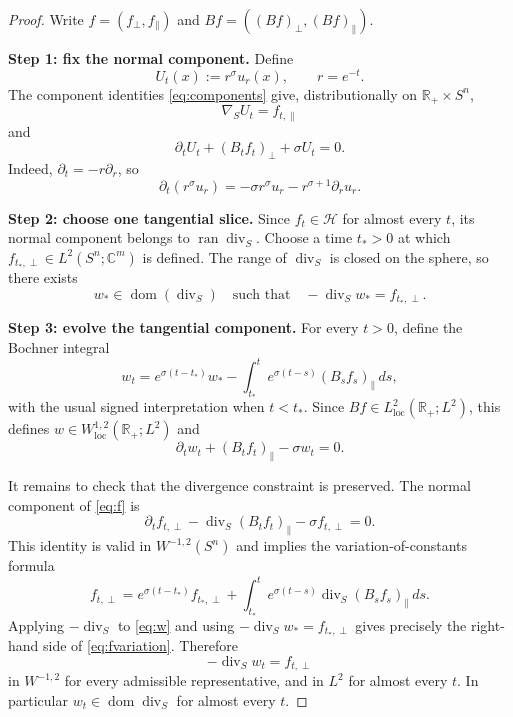 \documentclass[11pt]{article}
\newcommand{\Sphere}{S^n}
\newcommand{\cH}{\mathcal H}
\newcommand{\Div}{\operatorname{div}_{S}}
\newcommand{\grad}{\nabla_{S}}
\newcommand{\R}{\mathbb R}
\newcommand{\C}{\mathbb C}
\newcommand{\dom}{\operatorname{dom}}
\begin{document}
\begin{proof}
Write $f=(f_\perp,f_\parallel)$ and $Bf=((Bf)_\perp,(Bf)_\parallel)$.

\medskip
\noindent\textbf{Step 1: fix the normal component.}
Define
\[
 U_t(x):=r^\sigma u_r(x),\qquad r=e^{-t}.
\]
The component identities \eqref{eq:components} give, distributionally on $\R_+\times\Sphere$,
\begin{equation}\label{eq:Uspace}
 \grad U_t=f_{t,\parallel}
\end{equation}
and
\begin{equation}\label{eq:Utime}
 \partial_tU_t+(B_tf_t)_\perp+\sigma U_t=0.
\end{equation}
Indeed, $\partial_t=-r\partial_r$, so
\[
 \partial_t(r^\sigma u_r)
 =-\sigma r^\sigma u_r-r^{\sigma+1}\partial_r u_r.
\]

\medskip
\noindent\textbf{Step 2: choose one tangential slice.}
Since $f_t\in\cH$ for almost every $t$, its normal component belongs to $\operatorname{ran}\Div$. Choose a time $t_*>0$ at which $f_{t_*,\perp}\in L^2(\Sphere;\C^m)$ is defined. The range of $\Div$ is closed on the sphere, so there exists
\[
 w_*\in\dom(\Div)
 \quad\text{such that}\quad
 -\Div w_*=f_{t_*,\perp}.
\]

\medskip
\noindent\textbf{Step 3: evolve the tangential component.}
For every $t>0$, define the Bochner integral
\begin{equation}\label{eq:w}
 w_t=e^{\sigma(t-t_*)}w_*
 -\int_{t_*}^{t}e^{\sigma(t-s)}(B_sf_s)_\parallel\,ds,
\end{equation}
with the usual signed interpretation when $t<t_*$. Since $Bf\in L^2_{\mathrm{loc}}(\R_+;L^2)$, this defines
$w\in W^{1,2}_{\mathrm{loc}}(\R_+;L^2)$ and
\begin{equation}\label{eq:wt}
 \partial_tw_t+(B_tf_t)_\parallel-\sigma w_t=0.
\end{equation}

It remains to check that the divergence constraint is preserved. The normal component of \eqref{eq:f} is
\begin{equation}\label{eq:fnormal}
 \partial_tf_{t,\perp}-\Div(B_tf_t)_\parallel-\sigma f_{t,\perp}=0.
\end{equation}
This identity is valid in $W^{-1,2}(\Sphere)$ and implies the variation-of-constants formula
\begin{equation}\label{eq:fvariation}
 f_{t,\perp}=e^{\sigma(t-t_*)}f_{t_*,\perp}
 +\int_{t_*}^{t}e^{\sigma(t-s)}\Div(B_sf_s)_\parallel\,ds.
\end{equation}
Applying $-\Div$ to \eqref{eq:w} and using $-\Div w_*=f_{t_*,\perp}$ gives precisely the right-hand side of \eqref{eq:fvariation}. Therefore
\begin{equation}\label{eq:divconstraint}
 -\Div w_t=f_{t,\perp}
\end{equation}
in $W^{-1,2}$ for every admissible representative, and in $L^2$ for almost every $t$. In particular $w_t\in\dom\Div$ for almost every $t$.


\end{proof}
\end{document}
